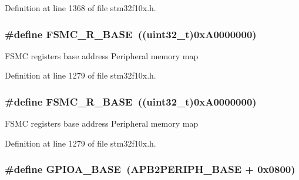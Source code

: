Definition at line 1368 of file stm32f10x.\+h.

\subsubsection[{\texorpdfstring{F\+S\+M\+C\+\_\+\+R\+\_\+\+B\+A\+SE}{FSMC_R_BASE}}]{\setlength{\rightskip}{0pt plus 5cm}\#define F\+S\+M\+C\+\_\+\+R\+\_\+\+B\+A\+SE~(({\bf uint32\+\_\+t})0x\+A0000000)}\hypertarget{group___peripheral__memory__map_gaddf0e199dccba83272b20c9fb4d3aaed}{}\label{group___peripheral__memory__map_gaddf0e199dccba83272b20c9fb4d3aaed}
F\+S\+MC registers base address Peripheral memory map 

Definition at line 1279 of file stm32f10x.\+h.

\subsubsection[{\texorpdfstring{F\+S\+M\+C\+\_\+\+R\+\_\+\+B\+A\+SE}{FSMC_R_BASE}}]{\setlength{\rightskip}{0pt plus 5cm}\#define F\+S\+M\+C\+\_\+\+R\+\_\+\+B\+A\+SE~(({\bf uint32\+\_\+t})0x\+A0000000)}\hypertarget{group___peripheral__memory__map_gaddf0e199dccba83272b20c9fb4d3aaed}{}\label{group___peripheral__memory__map_gaddf0e199dccba83272b20c9fb4d3aaed}
F\+S\+MC registers base address Peripheral memory map 

Definition at line 1279 of file stm32f10x.\+h.

\subsubsection[{\texorpdfstring{G\+P\+I\+O\+A\+\_\+\+B\+A\+SE}{GPIOA_BASE}}]{\setlength{\rightskip}{0pt plus 5cm}\#define G\+P\+I\+O\+A\+\_\+\+B\+A\+SE~({\bf A\+P\+B2\+P\+E\+R\+I\+P\+H\+\_\+\+B\+A\+SE} + 0x0800)}\hypertarget{group___peripheral__memory__map_gad7723846cc5db8e43a44d78cf21f6efa}{}\label{group___peripheral__memory__map_gad7723846cc5db8e43a44d78cf21f6efa}


